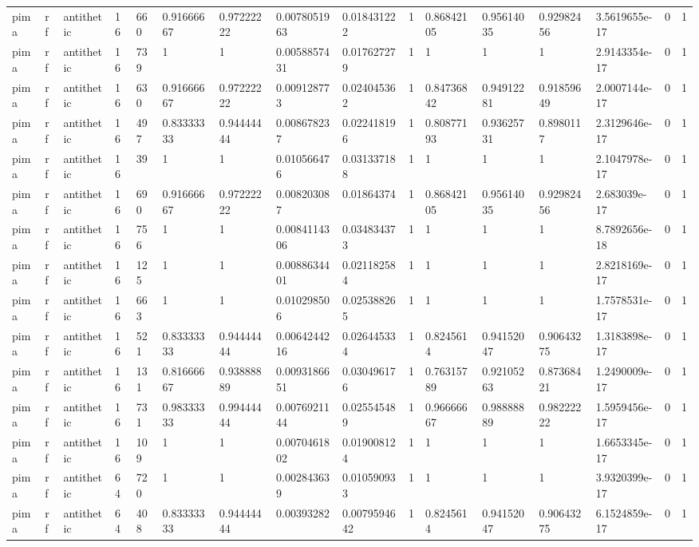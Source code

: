 \begin{tabular}{llllllllllllllll}
pima & rf & antithetic & 16 & 660 & 0.91666667 & 0.97222222 & 0.0078051963 & 0.018431222 & 1 & 0.86842105 & 0.95614035 & 0.92982456 & 3.5619655e-17 & 0 & 1 \\
pima & rf & antithetic & 16 & 739 & 1 & 1 & 0.0058857431 & 0.017627279 & 1 & 1 & 1 & 1 & 2.9143354e-17 & 0 & 1 \\
pima & rf & antithetic & 16 & 630 & 0.91666667 & 0.97222222 & 0.009128773 & 0.024045362 & 1 & 0.84736842 & 0.94912281 & 0.91859649 & 2.0007144e-17 & 0 & 1 \\
pima & rf & antithetic & 16 & 497 & 0.83333333 & 0.94444444 & 0.008678237 & 0.022418196 & 1 & 0.80877193 & 0.93625731 & 0.8980117 & 2.3129646e-17 & 0 & 1 \\
pima & rf & antithetic & 16 & 39 & 1 & 1 & 0.010566476 & 0.031337188 & 1 & 1 & 1 & 1 & 2.1047978e-17 & 0 & 1 \\
pima & rf & antithetic & 16 & 690 & 0.91666667 & 0.97222222 & 0.008203087 & 0.01864374 & 1 & 0.86842105 & 0.95614035 & 0.92982456 & 2.683039e-17 & 0 & 1 \\
pima & rf & antithetic & 16 & 756 & 1 & 1 & 0.0084114306 & 0.034834373 & 1 & 1 & 1 & 1 & 8.7892656e-18 & 0 & 1 \\
pima & rf & antithetic & 16 & 125 & 1 & 1 & 0.0088634401 & 0.021182584 & 1 & 1 & 1 & 1 & 2.8218169e-17 & 0 & 1 \\
pima & rf & antithetic & 16 & 663 & 1 & 1 & 0.010298506 & 0.025388265 & 1 & 1 & 1 & 1 & 1.7578531e-17 & 0 & 1 \\
pima & rf & antithetic & 16 & 521 & 0.83333333 & 0.94444444 & 0.0064244216 & 0.026445334 & 1 & 0.8245614 & 0.94152047 & 0.90643275 & 1.3183898e-17 & 0 & 1 \\
pima & rf & antithetic & 16 & 131 & 0.81666667 & 0.93888889 & 0.0093186651 & 0.030496176 & 1 & 0.76315789 & 0.92105263 & 0.87368421 & 1.2490009e-17 & 0 & 1 \\
pima & rf & antithetic & 16 & 731 & 0.98333333 & 0.99444444 & 0.0076921144 & 0.025545489 & 1 & 0.96666667 & 0.98888889 & 0.98222222 & 1.5959456e-17 & 0 & 1 \\
pima & rf & antithetic & 16 & 109 & 1 & 1 & 0.0070461802 & 0.019008124 & 1 & 1 & 1 & 1 & 1.6653345e-17 & 0 & 1 \\
pima & rf & antithetic & 64 & 720 & 1 & 1 & 0.002843639 & 0.010590933 & 1 & 1 & 1 & 1 & 3.9320399e-17 & 0 & 1 \\
pima & rf & antithetic & 64 & 408 & 0.83333333 & 0.94444444 & 0.00393282 & 0.0079594642 & 1 & 0.8245614 & 0.94152047 & 0.90643275 & 6.1524859e-17 & 0 & 1 \\

\end{tabular}
